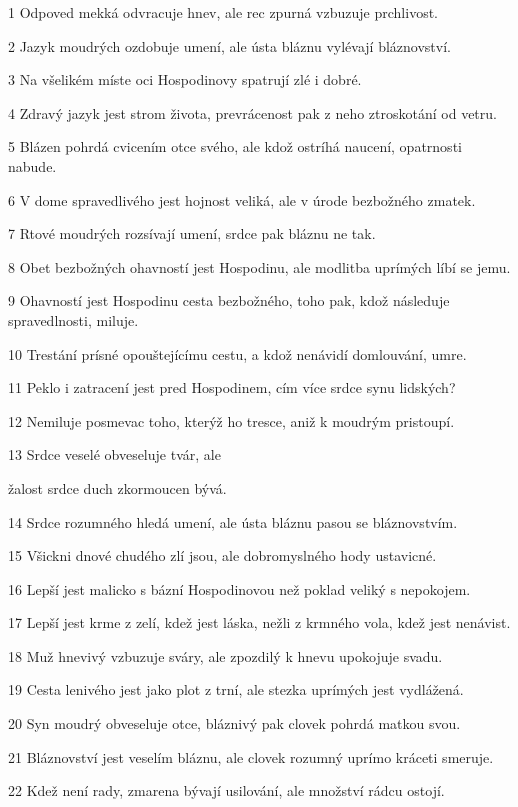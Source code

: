 \par 1 Odpoved mekká odvracuje hnev, ale rec zpurná vzbuzuje prchlivost.
\par 2 Jazyk moudrých ozdobuje umení, ale ústa bláznu vylévají bláznovství.
\par 3 Na všelikém míste oci Hospodinovy spatrují zlé i dobré.
\par 4 Zdravý jazyk jest strom života, prevrácenost pak z neho ztroskotání od vetru.
\par 5 Blázen pohrdá cvicením otce svého, ale kdož ostríhá naucení, opatrnosti nabude.
\par 6 V dome spravedlivého jest hojnost veliká, ale v úrode bezbožného zmatek.
\par 7 Rtové moudrých rozsívají umení, srdce pak bláznu ne tak.
\par 8 Obet bezbožných ohavností jest Hospodinu, ale modlitba uprímých líbí se jemu.
\par 9 Ohavností jest Hospodinu cesta bezbožného, toho pak, kdož následuje spravedlnosti, miluje.
\par 10 Trestání prísné opouštejícímu cestu, a kdož nenávidí domlouvání, umre.
\par 11 Peklo i zatracení jest pred Hospodinem, cím více srdce synu lidských?
\par 12 Nemiluje posmevac toho, kterýž ho tresce, aniž k moudrým pristoupí.
\par 13 Srdce veselé obveseluje tvár, ale \par žalost srdce duch zkormoucen bývá.
\par 14 Srdce rozumného hledá umení, ale ústa bláznu pasou se bláznovstvím.
\par 15 Všickni dnové chudého zlí jsou, ale dobromyslného hody ustavicné.
\par 16 Lepší jest malicko s bázní Hospodinovou než poklad veliký s nepokojem.
\par 17 Lepší jest krme z zelí, kdež jest láska, nežli z krmného vola, kdež jest nenávist.
\par 18 Muž hnevivý vzbuzuje sváry, ale zpozdilý k hnevu upokojuje svadu.
\par 19 Cesta lenivého jest jako plot z trní, ale stezka uprímých jest vydlážená.
\par 20 Syn moudrý obveseluje otce, bláznivý pak clovek pohrdá matkou svou.
\par 21 Bláznovství jest veselím bláznu, ale clovek rozumný uprímo kráceti smeruje.
\par 22 Kdež není rady, zmarena bývají usilování, ale množství rádcu ostojí.
